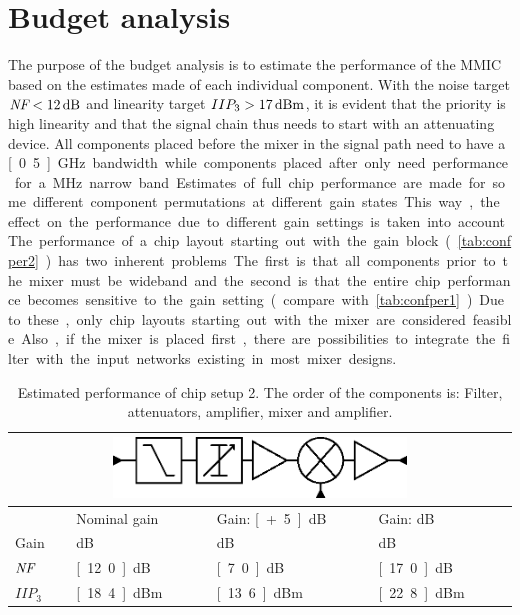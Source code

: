 	\section{Budget analysis}\label{sec:budget_analysis}
		The purpose of the budget analysis is to estimate the performance of the MMIC based on the estimates made of each individual component. With the noise target $\nf<\unit[12]{dB}$ and linearity target $IIP_3>\unit[17]{dBm}$, it is evident that the priority is high linearity and that the signal chain thus needs to start with an attenuating device. All components placed before the mixer in the signal path need to have a \unit[0.5]{GHz} bandwidth while components placed after only need performance for a \unit[20]{MHz} narrow band. Estimates of full chip performance are made for some different component permutations at different gain states. This way, the effect on the performance due to different gain settings is taken into account.

		The performance of a chip layout starting out with the gain block (\autoref{tab:confper2}) has two inherent problems. The first is that all components prior to the mixer must be wideband and the second is that the entire chip performance becomes sensitive to the gain setting (compare with \autoref{tab:confper1}). Due to these, only chip layouts starting out with the mixer are considered feasible. Also, if the mixer is placed first, there are possibilities to integrate the filter with the input networks existing in most mixer designs.
		
		\begin{table}[hpt!]
			\caption[Estimated performance of chip setup 2.]{Estimated performance of chip setup 2. The order of the components is: Filter, attenuators, amplifier, mixer and amplifier.}
			\label{tab:confper2}
			\centering
			\begin{tabular}{ l l l l }
				\multicolumn{4}{c}{\includegraphics[width=0.6\textwidth]{fig/system/sys2}} \\\toprule
				& Nominal gain & Gain: \unit[+5]{dB} & Gain: \unit[-5]{dB} \\\midrule
				Gain & \unit[9]{dB} & \unit[14]{dB} & \unit[4]{dB} \\
				$\emph{NF}$ & \unit[12.0]{dB} & \unit[7.0]{dB} & \unit[17.0]{dB} \\
				$IIP_3$ & \unit[18.4]{dBm} & \unit[13.6]{dBm} & \unit[22.8]{dBm} \\\bottomrule
			\end{tabular}
		\end{table}

